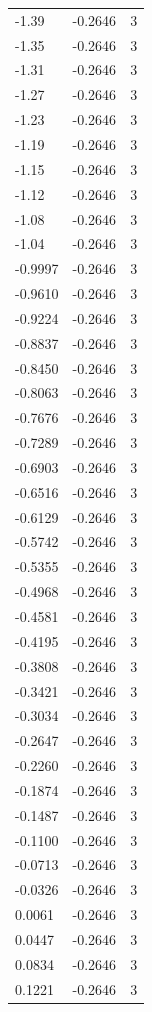 \begin{longtable}{lrr}
  -1.39 & -0.2646 & 3 \\
  -1.35 & -0.2646 & 3 \\
  -1.31 & -0.2646 & 3 \\
  -1.27 & -0.2646 & 3 \\
  -1.23 & -0.2646 & 3 \\
  -1.19 & -0.2646 & 3 \\
  -1.15 & -0.2646 & 3 \\
  -1.12 & -0.2646 & 3 \\
  -1.08 & -0.2646 & 3 \\
  -1.04 & -0.2646 & 3 \\
  -0.9997 & -0.2646 & 3 \\
  -0.9610 & -0.2646 & 3 \\
  -0.9224 & -0.2646 & 3 \\
  -0.8837 & -0.2646 & 3 \\
  -0.8450 & -0.2646 & 3 \\
  -0.8063 & -0.2646 & 3 \\
  -0.7676 & -0.2646 & 3 \\
  -0.7289 & -0.2646 & 3 \\
  -0.6903 & -0.2646 & 3 \\
  -0.6516 & -0.2646 & 3 \\
  -0.6129 & -0.2646 & 3 \\
  -0.5742 & -0.2646 & 3 \\
  -0.5355 & -0.2646 & 3 \\
  -0.4968 & -0.2646 & 3 \\
  -0.4581 & -0.2646 & 3 \\
  -0.4195 & -0.2646 & 3 \\
  -0.3808 & -0.2646 & 3 \\
  -0.3421 & -0.2646 & 3 \\
  -0.3034 & -0.2646 & 3 \\
  -0.2647 & -0.2646 & 3 \\
  -0.2260 & -0.2646 & 3 \\
  -0.1874 & -0.2646 & 3 \\
  -0.1487 & -0.2646 & 3 \\
  -0.1100 & -0.2646 & 3 \\
  -0.0713 & -0.2646 & 3 \\
  -0.0326 & -0.2646 & 3 \\
  0.0061 & -0.2646 & 3 \\
  0.0447 & -0.2646 & 3 \\
  0.0834 & -0.2646 & 3 \\
  0.1221 & -0.2646 & 3 \\

\end{longtable}
